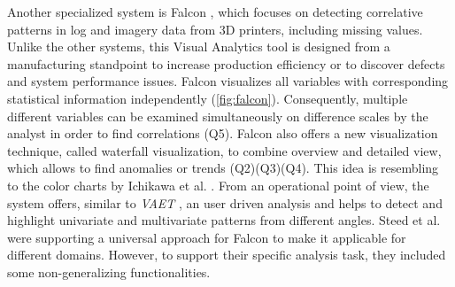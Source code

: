 \documentclass[electronic]{vgtc}             %
\begin{document}
Another specialized system is Falcon \cite{steed:2017}, which focuses on detecting correlative patterns in log and imagery data from 3D printers, including missing values.
Unlike the other systems, this Visual Analytics tool is designed from a manufacturing standpoint to increase production efficiency or to discover defects and system performance issues.
Falcon visualizes all variables with corresponding statistical information independently (\autoref{fig:falcon}). 
Consequently, multiple different variables can be examined simultaneously  on difference scales by the analyst in order to find correlations (Q5).
Falcon also offers a new visualization technique, called waterfall visualization, to combine overview and detailed view, which allows to find anomalies or trends (Q2)(Q3)(Q4). 
This idea is resembling to the color charts by Ichikawa et al. \cite{ichikawa:2002}.
From an operational point of view, the system offers, similar to \textit{VAET}  \cite{Xie:2014}, an user driven analysis and helps to detect and highlight univariate and multivariate patterns from different angles.
Steed et al. were supporting a universal approach for Falcon to make it applicable for different domains. 
However, to support their specific analysis task, they included some non-generalizing functionalities. 
\end{document}
